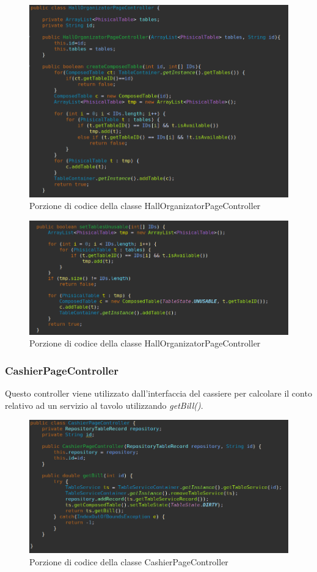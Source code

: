 \documentclass{article}
\begin{document}
\begin{figure}[!h]
\centering
\includegraphics[width= 12cm]{"Codice/HallPage1.PNG"}
\caption{Porzione di codice della classe HallOrganizatorPageController}
\end{figure}

\begin{figure}[!h]
\centering
\includegraphics[width= 12cm]{"Codice/HallPage2.PNG"}
\caption{Porzione di codice della classe HallOrganizatorPageController}
\end{figure}

\newpage

\subsubsection{CashierPageController}

Questo controller viene utilizzato dall'interfaccia del cassiere per calcolare il conto relativo ad un servizio al tavolo utilizzando \textit{getBill()}.

\begin{figure}[!h]
\centering
\includegraphics[width= 12cm]{"Codice/CassierePage.PNG"}
\caption{Porzione di codice della classe CashierPageController}
\end{figure}
\end{document}
